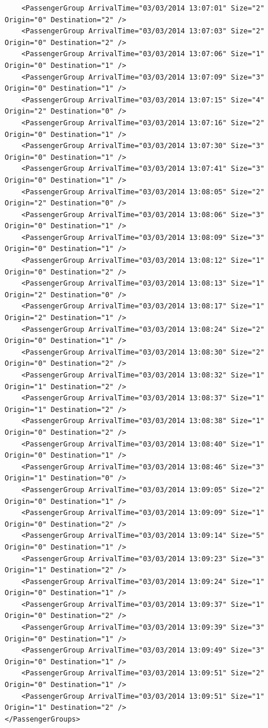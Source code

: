 \documentclass{UoYCSproject}
\begin{document}
\begin{appendices}
\begin{lstlisting}
	<PassengerGroup ArrivalTime="03/03/2014 13:07:01" Size="2" Origin="0" Destination="2" />
	<PassengerGroup ArrivalTime="03/03/2014 13:07:03" Size="2" Origin="0" Destination="2" />
	<PassengerGroup ArrivalTime="03/03/2014 13:07:06" Size="1" Origin="0" Destination="1" />
	<PassengerGroup ArrivalTime="03/03/2014 13:07:09" Size="3" Origin="0" Destination="1" />
	<PassengerGroup ArrivalTime="03/03/2014 13:07:15" Size="4" Origin="2" Destination="0" />
	<PassengerGroup ArrivalTime="03/03/2014 13:07:16" Size="2" Origin="0" Destination="1" />
	<PassengerGroup ArrivalTime="03/03/2014 13:07:30" Size="3" Origin="0" Destination="1" />
	<PassengerGroup ArrivalTime="03/03/2014 13:07:41" Size="3" Origin="0" Destination="1" />
	<PassengerGroup ArrivalTime="03/03/2014 13:08:05" Size="2" Origin="2" Destination="0" />
	<PassengerGroup ArrivalTime="03/03/2014 13:08:06" Size="3" Origin="0" Destination="1" />
	<PassengerGroup ArrivalTime="03/03/2014 13:08:09" Size="3" Origin="0" Destination="1" />
	<PassengerGroup ArrivalTime="03/03/2014 13:08:12" Size="1" Origin="0" Destination="2" />
	<PassengerGroup ArrivalTime="03/03/2014 13:08:13" Size="1" Origin="2" Destination="0" />
	<PassengerGroup ArrivalTime="03/03/2014 13:08:17" Size="1" Origin="2" Destination="1" />
	<PassengerGroup ArrivalTime="03/03/2014 13:08:24" Size="2" Origin="0" Destination="1" />
	<PassengerGroup ArrivalTime="03/03/2014 13:08:30" Size="2" Origin="0" Destination="2" />
	<PassengerGroup ArrivalTime="03/03/2014 13:08:32" Size="1" Origin="1" Destination="2" />
	<PassengerGroup ArrivalTime="03/03/2014 13:08:37" Size="1" Origin="1" Destination="2" />
	<PassengerGroup ArrivalTime="03/03/2014 13:08:38" Size="1" Origin="0" Destination="2" />
	<PassengerGroup ArrivalTime="03/03/2014 13:08:40" Size="1" Origin="0" Destination="1" />
	<PassengerGroup ArrivalTime="03/03/2014 13:08:46" Size="3" Origin="1" Destination="0" />
	<PassengerGroup ArrivalTime="03/03/2014 13:09:05" Size="2" Origin="0" Destination="1" />
	<PassengerGroup ArrivalTime="03/03/2014 13:09:09" Size="1" Origin="0" Destination="2" />
	<PassengerGroup ArrivalTime="03/03/2014 13:09:14" Size="5" Origin="0" Destination="1" />
	<PassengerGroup ArrivalTime="03/03/2014 13:09:23" Size="3" Origin="1" Destination="2" />
	<PassengerGroup ArrivalTime="03/03/2014 13:09:24" Size="1" Origin="0" Destination="1" />
	<PassengerGroup ArrivalTime="03/03/2014 13:09:37" Size="1" Origin="0" Destination="2" />
	<PassengerGroup ArrivalTime="03/03/2014 13:09:39" Size="3" Origin="0" Destination="1" />
	<PassengerGroup ArrivalTime="03/03/2014 13:09:49" Size="3" Origin="0" Destination="1" />
	<PassengerGroup ArrivalTime="03/03/2014 13:09:51" Size="2" Origin="0" Destination="1" />
	<PassengerGroup ArrivalTime="03/03/2014 13:09:51" Size="1" Origin="1" Destination="2" />
</PassengerGroups>
\end{lstlisting}


\end{appendices}
\end{document}
